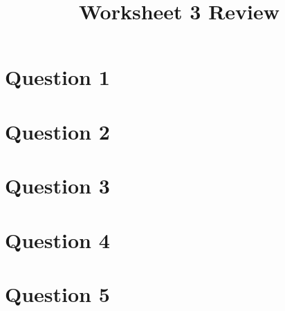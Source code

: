 \documentclass[12pt]{article}
\begin{document}
\title{Worksheet 3 Review}
\maketitle

\section*{Question 1}

\section*{Question 2}

\section*{Question 3}

\section*{Question 4}

\section*{Question 5}
\end{document}
